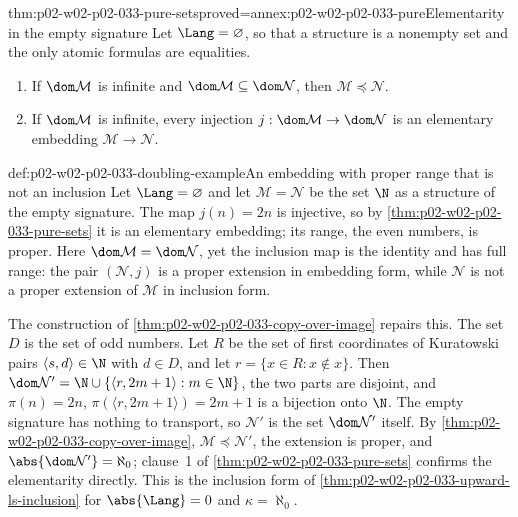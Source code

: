 \begin{hblemma}{thm:p02-w02-p02-033-pure-sets}{proved=annex:p02-w02-p02-033-pure}{Elementarity in the empty signature}
Let \(\Lang=\varnothing\), so that a structure is a nonempty set and the only
atomic formulas are equalities.
\begin{enumerate}
  \item If \(\dom\mathcal M\) is infinite and
        \(\dom\mathcal M\subseteq\dom\mathcal N\), then
        \(\mathcal M\preccurlyeq\mathcal N\).
  \item If \(\dom\mathcal M\) is infinite, every injection
        \(j:\dom\mathcal M\to\dom\mathcal N\) is an elementary embedding
        \(\mathcal M\to\mathcal N\).
\end{enumerate}
\end{hblemma}

\begin{hbexample}{def:p02-w02-p02-033-doubling-example}{An embedding with proper range that is not an inclusion}
Let \(\Lang=\varnothing\) and let \(\mathcal M=\mathcal N\) be the set
\(\N\) as a structure of the empty signature.  The map \(j(n)=2n\) is
injective, so by \cref{thm:p02-w02-p02-033-pure-sets} it is an elementary
embedding; its range, the even numbers, is proper.  Here
\(\dom\mathcal M=\dom\mathcal N\), yet the inclusion map is the identity and
has full range: the pair \((\mathcal N,j)\) is a proper extension in
embedding form, while \(\mathcal N\) is not a proper extension of
\(\mathcal M\) in inclusion form.

The construction of \cref{thm:p02-w02-p02-033-copy-over-image} repairs
this.  The set \(D\) is the set of odd numbers.  Let \(R\) be the set of
first coordinates of Kuratowski pairs \(\langle s,d\rangle\in\N\) with
\(d\in D\), and let \(r=\{x\in R:x\notin x\}\).  Then
\(\dom\mathcal N'=\N\cup\{\langle r,2m+1\rangle:m\in\N\}\), the two parts are
disjoint, and \(\pi(n)=2n\), \(\pi(\langle r,2m+1\rangle)=2m+1\) is a
bijection onto \(\N\).  The empty signature has nothing to transport, so
\(\mathcal N'\) is the set \(\dom\mathcal N'\) itself.  By
\cref{thm:p02-w02-p02-033-copy-over-image},
\(\mathcal M\preccurlyeq\mathcal N'\), the extension is proper, and
\(\abs{\dom\mathcal N'}=\aleph_0\); clause~1 of
\cref{thm:p02-w02-p02-033-pure-sets} confirms the elementarity directly.
This is the inclusion form of \cref{thm:p02-w02-p02-033-upward-ls-inclusion}
for \(\abs{\Lang}=0\) and \(\kappa=\aleph_0\).
\end{hbexample}

